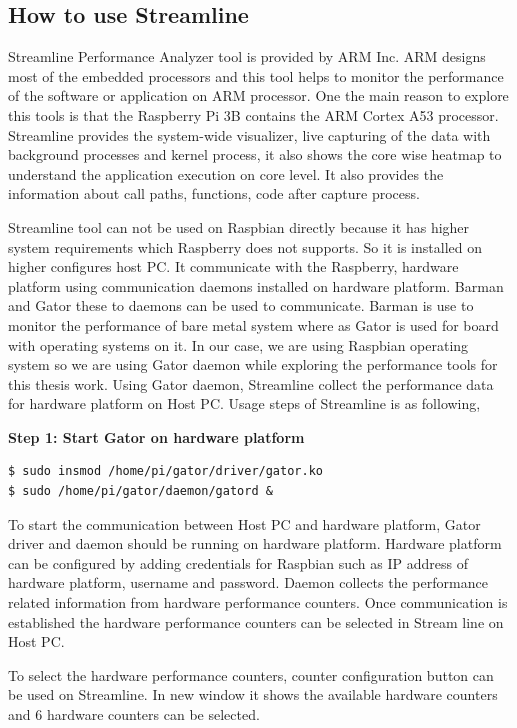 \subsection{How to use Streamline}
Streamline Performance Analyzer tool is provided by ARM Inc. ARM designs most of the embedded processors and this tool helps to monitor the performance of the software or application on ARM processor. One the main reason to explore this tools is that the Raspberry Pi 3B contains the ARM Cortex A53 processor.  Streamline provides the system-wide visualizer, live capturing of the data with background processes and kernel process, it also shows the core wise heatmap to understand the application execution on core level. It also provides the information about call paths, functions, code after capture process. 

\par Streamline tool can not be used on Raspbian directly because it has higher system requirements which Raspberry does not supports. So it is installed on higher configures host PC. It communicate with the Raspberry, hardware platform using communication daemons installed on hardware platform. Barman and Gator these to daemons can be used to communicate. Barman is use to monitor the performance of bare metal system where as Gator is used for board with operating systems on it. In our case, we are using Raspbian operating system so we are using Gator daemon while exploring the performance tools for this thesis work. Using Gator daemon, Streamline collect the performance data for hardware platform on Host PC. Usage steps of Streamline is as following,

  \textbf{Step 1: Start Gator on hardware platform}
\begin{lstlisting}
$ sudo insmod /home/pi/gator/driver/gator.ko
$ sudo /home/pi/gator/daemon/gatord &
\end{lstlisting}

To start the communication between Host PC and hardware platform, Gator driver and daemon should be running on hardware platform. Hardware platform can be configured by adding credentials for Raspbian such as IP address of hardware platform, username and password. Daemon collects the performance related information from hardware performance counters. Once communication is established the hardware performance counters can be selected in Stream line on Host PC. 

To select the hardware performance counters, counter configuration button can be used on Streamline. In new window it shows the available hardware counters and 6 hardware counters can be selected.

